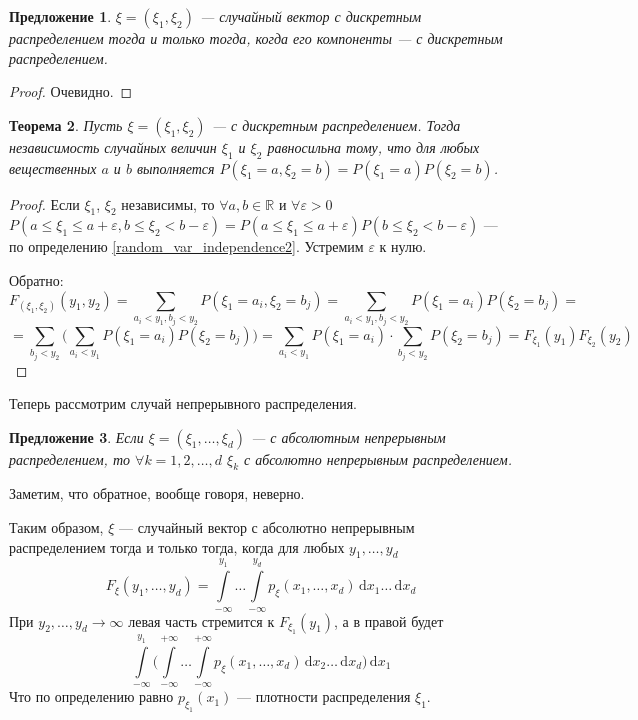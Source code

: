 \documentclass[11pt,openany,a4paper]{scrartcl}
\theoremstyle{plain}
\newtheorem{theorem}{Теорема}[subsection]
\newtheorem{proposition}[theorem]{Предложение}
\theoremstyle{definition}
\newcommand\mb{\mathbb}
\newcommand\real{\mb R}
\newcommand{\dif}{\, \mathrm d}
\begin{document}
\begin{proposition}
    $\xi = (\xi_1, \xi_2)$ — случайный вектор с дискретным распределением
    тогда и только тогда, когда его компоненты — с дискретным распределением.
\end{proposition}
\begin{proof}
    Очевидно.
\end{proof}

\begin{theorem}
    Пусть $\xi = (\xi_1, \xi_2)$ — с дискретным распределением.
    Тогда независимость
    случайных величин $\xi_1$ и $\xi_2$ равносильна тому, что для любых 
    вещественных $a$ и $b$ выполняется $P(\xi_1 = a, \xi_2 = b) =
    P(\xi_1 = a)P(\xi_2 = b)$.
\end{theorem}
\begin{proof}
        Если $\xi_1$, $\xi_2$ независимы, то
        $\forall a,b \in \real$ и $\forall \varepsilon > 0$
        $P(a \leqslant \xi_1 \leqslant a + \varepsilon,
        b \leqslant \xi_2 < b - \varepsilon) =
        P(a \leqslant \xi_1 \leqslant a + \varepsilon)
        P(b \leqslant \xi_2 < b - \varepsilon)$ — по определению 
        \ref{random_var_independence2}. Устремим $\varepsilon$ к нулю.
        
        Обратно:
        $$
        F_{(\xi_1, \xi_2)}(y_1, y_2) =
        \sum\limits_{a_i < y_1, b_j < y_2} P(\xi_1 = a_i, \xi_2 = b_j) =
        \sum\limits_{a_i < y_1, b_j < y_2} P(\xi_1 = a_i)P(\xi_2 = b_j) =
        $$
        $$
        = \sum\limits_{b_j < y_2}\Bigg(\sum\limits_{a_i < y_1}
        P(\xi_1 = a_i)P(\xi_2 = b_j)\Bigg) =
        \sum\limits_{a_i < y_1} P(\xi_1 = a_i) \cdot
        \sum\limits_{b_j < y_2} P(\xi_2 = b_j) =
        F_{\xi_1}(y_1) F_{\xi_2}(y_2)
        $$
\end{proof}

Теперь рассмотрим случай непрерывного распределения.

\begin{proposition}
    Если $\xi = (\xi_1, \ldots, \xi_d)$ — с абсолютным непрерывным распределением,
    то $\forall k = 1, 2,\ldots, d$ $\xi_k$ с абсолютно непрерывным 
    распределением.
\end{proposition}

Заметим, что обратное, вообще говоря, неверно.

Таким образом, $\xi$ — случайный вектор с абсолютно непрерывным 
распределением тогда и только тогда, когда для любых $y_1, \ldots, y_d$
$$
F_\xi(y_1, \ldots, y_d) = \int\limits_{-\infty}^{y_1}\ldots
\int\limits_{-\infty}^{y_d} p_\xi(x_1, \ldots, x_d) \dif x_1\ldots \dif x_d
$$
При $y_2, \ldots, y_d \to \infty$ левая часть стремится к $F_{\xi_1}(y_1)$,
а в правой будет
$$
\int\limits_{-\infty}^{y_1}\Bigg(\int\limits_{-\infty}^{+\infty}\ldots
\int\limits_{-\infty}^{+\infty} p_\xi(x_1, \ldots, x_d)
\dif x_2\ldots\dif x_d\Bigg)\dif x_1
$$
Что по определению равно $p_{\xi_1}(x_1)$ — плотности распределения $\xi_1$.
\end{document}
